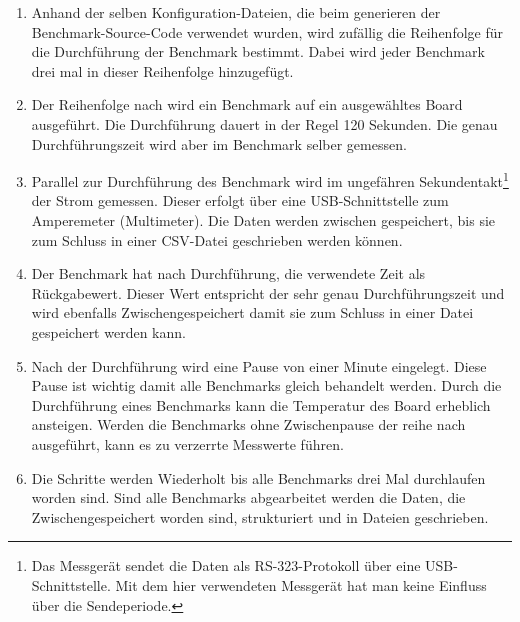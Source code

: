 \begin{enumerate}
\item Anhand der selben Konfiguration-Dateien, die beim generieren der Benchmark-Source-Code verwendet wurden, wird zufällig die Reihenfolge für die Durchführung der Benchmark bestimmt. Dabei wird jeder Benchmark drei mal in dieser Reihenfolge hinzugefügt.
\item Der Reihenfolge nach wird ein Benchmark auf ein ausgewähltes Board ausgeführt. Die Durchführung dauert in der Regel 120 Sekunden. Die genau Durchführungszeit wird aber im Benchmark selber gemessen.
\item Parallel zur Durchführung des Benchmark wird im ungefähren Sekundentakt\footnote{Das Messgerät sendet die Daten als RS-323-Protokoll über eine USB-Schnittstelle. Mit dem hier verwendeten Messgerät hat man keine Einfluss über die Sendeperiode.} der Strom gemessen. Dieser erfolgt über eine USB-Schnittstelle zum Amperemeter (Multimeter). Die Daten werden zwischen gespeichert, bis sie zum Schluss in einer CSV-Datei geschrieben werden können.
\item Der Benchmark hat nach Durchführung, die verwendete Zeit als Rückgabewert. Dieser Wert entspricht der sehr genau Durchführungszeit und wird ebenfalls Zwischengespeichert damit sie zum Schluss in einer Datei gespeichert werden kann.
\item Nach der Durchführung wird eine Pause von einer Minute eingelegt. Diese Pause ist wichtig damit alle Benchmarks gleich behandelt werden. Durch die Durchführung eines Benchmarks kann die Temperatur des Board erheblich ansteigen. Werden die Benchmarks ohne Zwischenpause der reihe nach ausgeführt, kann es zu verzerrte Messwerte führen.
\item Die Schritte werden Wiederholt bis alle Benchmarks drei Mal durchlaufen worden sind. Sind alle Benchmarks abgearbeitet werden die Daten, die Zwischengespeichert worden sind, strukturiert und in Dateien geschrieben.
\end{enumerate}